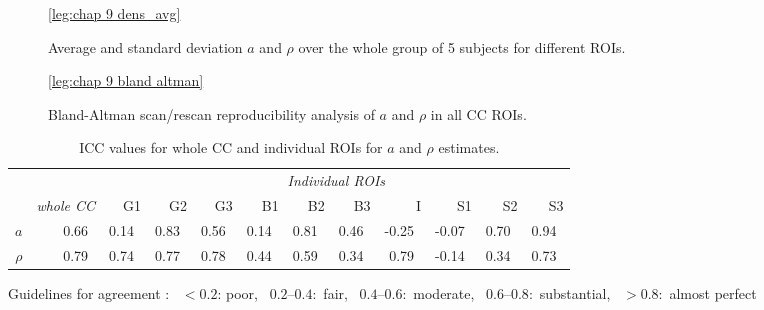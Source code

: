 \begin{figure}[ht]
	\centering
	\ref{leg:chap 9 dens_avg}\\	
	\caption{Average and standard deviation $a$ and $\rho$ over the whole group of 5 subjects for different \gls{ROI}s.}
	\label{fig:chap9 scan rescan averages}
\end{figure}

\begin{figure}[ht]
	\centering
	\ref{leg:chap 9 bland altman}	
	\caption{Bland-Altman scan/rescan reproducibility analysis of $a$ and $\rho$ in all \gls{CC} \gls{ROI}s.}
	\label{fig:chap9 bland altman plot}	
\end{figure}	



\begin{table}[ht]
\begin{captionframe}
\caption{ICC values for whole \gls{CC} and individual \gls{ROI}s for $a$ and $\rho$ estimates.}
\label{tab:chapter9 ICC table}
\end{captionframe}
\begin{tableframe}
\centering
\begin{adjustbox}{width={\textwidth},totalheight=\textheight,keepaspectratio}
\begin{tabular}{rrrrrrrrrrrr}
      \toprule
       & & \multicolumn{10}{c}{\textit{Individual \gls{ROI}s}}                                             \\
       & \textit{whole \gls{CC}} & G1    & G2    & G3    & B1    & B2    & B3    & I     & S1    & S2    & S3\\
       \cmidrule(rl){2-2} \cmidrule(l){3-12}
       \addlinespace
$a$    & 0.66~\usebox{\substantialBox} & 0.14~\usebox{\poorBox}  & 0.83~\usebox{\perfectBox} & 0.56~\usebox{\moderateBox}  & 0.14~\usebox{\poorBox}  & 0.81~\usebox{\perfectBox}  & 0.46~\usebox{\moderateBox}  & -0.25~\usebox{\poorBox} & -0.07~\usebox{\poorBox} & 0.70~\usebox{\substantialBox}  & 0.94~\usebox{\perfectBox}  \\
$\rho$ & 0.79~\usebox{\substantialBox} & 0.74~\usebox{\substantialBox}  & 0.77~\usebox{\substantialBox}  & 0.78~\usebox{\substantialBox}  & 0.44~\usebox{\moderateBox}  & 0.59~\usebox{\moderateBox}  & 0.34~\usebox{\fairBox}  & 0.79~\usebox{\substantialBox}  & -0.14~\usebox{\poorBox} & 0.34~\usebox{\fairBox}  & 0.73~\usebox{\substantialBox}  \\
\bottomrule
\end{tabular}
\end{adjustbox}
{\footnotesize Guidelines for agreement  \citep{Landis:1977}: \usebox{\poorBox}~$<0.2$: poor,  \usebox{\fairBox}~$0.2–0.4$:~fair,  \usebox{\moderateBox}~$0.4–0.6$:~moderate, \usebox{\substantialBox}~$0.6–0.8$:~substantial,  \usebox{\perfectBox}~$>0.8$:~almost perfect}
\end{tableframe}
\end{table}

